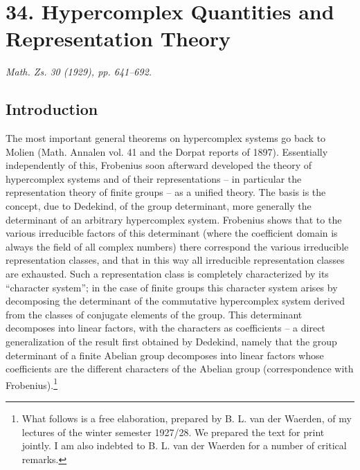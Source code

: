 \documentclass[11pt]{article}
\providecommand{\mG}{\mathfrak{G}}
\providecommand{\mA}{\mathfrak{A}}
\providecommand{\mB}{\mathfrak{B}}
\providecommand{\mC}{\mathfrak{C}}
\providecommand{\mD}{\mathfrak{D}}
\providecommand{\mE}{\mathfrak{E}}
\providecommand{\mH}{\mathfrak{H}}
\providecommand{\mK}{\mathfrak{K}}
\providecommand{\mM}{\mathfrak{M}}
\providecommand{\mN}{\mathfrak{N}}
\providecommand{\mR}{\mathfrak{R}}
\providecommand{\mS}{\mathfrak{S}}
\providecommand{\mT}{\mathfrak{T}}
\providecommand{\mU}{\mathfrak{U}}
\providecommand{\mO}{\mathfrak{O}}
\providecommand{\mo}{\mathfrak{o}}
\providecommand{\OO}{\Omega}
\providecommand{\Th}{\Theta}
\newcommand{\iso}{\simeq}
\newcommand{\normlhd}{\triangleleft}
\begin{document}
\providecommand{\mG}{\mathfrak{G}}
\providecommand{\mA}{\mathfrak{A}}
\providecommand{\mB}{\mathfrak{B}}
\providecommand{\mC}{\mathfrak{C}}
\providecommand{\mD}{\mathfrak{D}}
\providecommand{\mE}{\mathfrak{E}}
\providecommand{\mH}{\mathfrak{H}}
\providecommand{\mK}{\mathfrak{K}}
\providecommand{\mM}{\mathfrak{M}}
\providecommand{\mN}{\mathfrak{N}}
\providecommand{\mR}{\mathfrak{R}}
\providecommand{\mS}{\mathfrak{S}}
\providecommand{\mT}{\mathfrak{T}}
\providecommand{\mU}{\mathfrak{U}}
\providecommand{\mO}{\mathfrak{O}}
\providecommand{\mo}{\mathfrak{o}}
\providecommand{\OO}{\Omega}
\providecommand{\Th}{\Theta}
\providecommand{\iso}{\simeq}
\providecommand{\normlhd}{\triangleleft}

\setcounter{footnote}{0}

\section*{34. Hypercomplex Quantities and Representation Theory}
\emph{Math. Zs. 30 (1929), pp. 641--692.}

\subsection*{Introduction}

The most important general theorems on hypercomplex systems go back to Molien (Math. Annalen vol. 41 and the Dorpat reports of 1897). Essentially independently of this, Frobenius soon afterward developed the theory of hypercomplex systems and of their representations -- in particular the representation theory of finite groups -- as a unified theory. The basis is the concept, due to Dedekind, of the group determinant, more generally the determinant of an arbitrary hypercomplex system. Frobenius shows that to the various irreducible factors of this determinant (where the coefficient domain is always the field of all complex numbers) there correspond the various irreducible representation classes, and that in this way all irreducible representation classes are exhausted. Such a representation class is completely characterized by its ``character system''; in the case of finite groups this character system arises by decomposing the determinant of the commutative hypercomplex system derived from the classes of conjugate elements of the group. This determinant decomposes into linear factors, with the characters as coefficients -- a direct generalization of the result first obtained by Dedekind, namely that the group determinant of a finite Abelian group decomposes into linear factors whose coefficients are the different characters of the Abelian group (correspondence with Frobenius).\footnote{What follows is a free elaboration, prepared by B. L. van der Waerden, of my lectures of the winter semester 1927/28. We prepared the text for print jointly. I am also indebted to B. L. van der Waerden for a number of critical remarks.}
\end{document}
